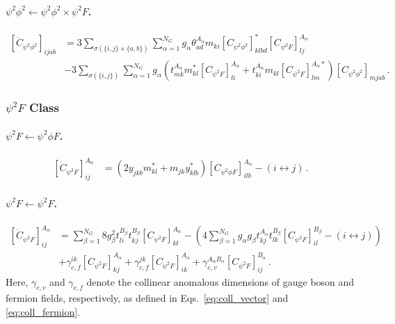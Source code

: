 \paragraph{$\psi^2\phi^2 \leftarrow \psi^2\phi^2 \times \psi^2 F$.}

\begin{align}
    \left[\dot C_{\psi^2\phi^2}\right]_{ijab} &= 3\sum_{\sigma(\{i,j\}\times\{a,b\})} \sum_{\alpha=1}^{N_G} g_\alpha \theta_{ad}^{A_\alpha} m_{ki} \left[C_{\psi^2\phi^2}\right]_{klbd}^* \left[C_{\psi^2 F}\right]_{lj}^{A_\alpha} \\
    &-3 
    \sum_{\sigma(\{i,j\})}\sum_{\alpha=1}^{N_G}
    g_\alpha \left(
    t^{A_\alpha}_{mk}m^*_{kl}\left[C_{\psi^2 F}\right]^{A_\alpha}_{li}+
    t^{A_\alpha}_{ki}m_{kl}\left[C_{\psi^2 F}\right]^{A_\alpha *}_{lm}\right)\left[C_{\psi^2\phi^2}\right]_{mjab}
    \,.\nonumber
\end{align}

\subsubsection{\texorpdfstring{$\psi^2 F$ Class}{psi2F Class}}

\paragraph{$\psi^2 F \leftarrow \psi^2 \phi F$.}
\begin{align}
    \left[\dot C_{\psi^2 F}\right]_{ij}^{A_\alpha} &=  \left(2y_{jkb}m^*_{kl}+m_{jk}y^*_{klb}\right)\left[C_{\psi^2\phi F}\right]_{ilb}^{A_\alpha}-(i\leftrightarrow j)\,.\label{psi2F_psi2phiF}
\end{align}

\paragraph{$\psi^2 F \leftarrow \psi^2 F$.}
\begin{align}
    \left[\dot C_{\psi^2 F}\right]_{ij}^{A_\alpha} &=  \sum_{\beta=1}^{N_G} 8 g_\beta^2 t^{B_\beta}_{li}t^{B_\beta}_{kj} \left[ C_{\psi^2 F}\right]_{kl}^{A_\alpha} - \left(4\sum_{\beta=1}^{N_G}g_\alpha g_\beta t^{A_\alpha}_{kj}t^{B_\beta}_{lk}\left[C_{\psi^2  F}\right]^{B_\beta}_{il}
    -\left(i \leftrightarrow j\right)\right)\nonumber \\& + \gamma_{c,f}^{ik}\left[C_{\psi^2 F}\right]^{A_\alpha}_{kj} + \gamma_{c,f}^{jk}\left[C_{\psi^2 F}\right]^{A_\alpha}_{ik}    + \gamma_{c,v}^{A_\alpha B_\alpha}\left[C_{\psi^2 F}\right]^{B_\alpha}_{ij}
    \,.\label{psi2F_psi2F}
\end{align}
Here, $\gamma_{c,v}$ and $\gamma_{c,f}$ denote the collinear anomalous dimensions of gauge boson and fermion fields, respectively, as defined in Eqs.~\eqref{eq:coll_vector} and \eqref{eq:coll_fermion}.

